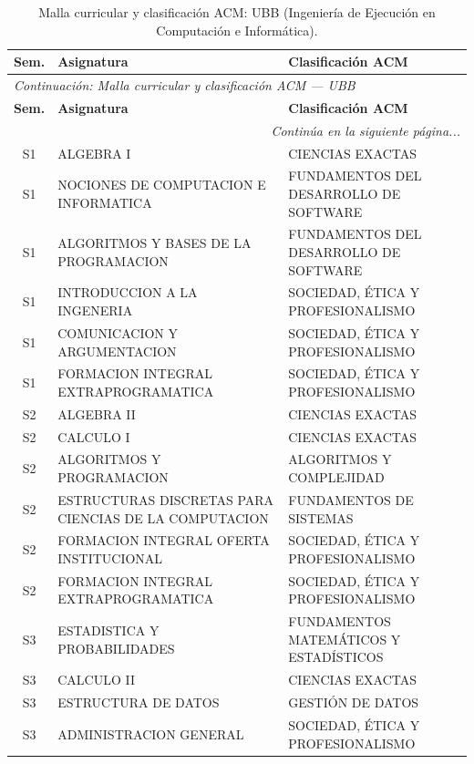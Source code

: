 \documentclass[11pt,a4paper]{article}
\begin{document}
\begin{small}
\begin{longtable}{c >{\raggedright\arraybackslash}p{8.5cm} >{\raggedright\arraybackslash}p{5.5cm}}
\caption{Malla curricular y clasificación ACM: UBB (Ingeniería de Ejecución en Computación e Informática).} \label{tab:UBB14} \\
\toprule
\textbf{Sem.} & \textbf{Asignatura} & \textbf{Clasificación ACM} \\
\midrule
\endfirsthead
\multicolumn{3}{l}{\small\textit{Continuación: Malla curricular y clasificación ACM --- UBB}} \\[3pt]
\toprule
\textbf{Sem.} & \textbf{Asignatura} & \textbf{Clasificación ACM} \\
\midrule
\endhead
\midrule
\multicolumn{3}{r}{\small\textit{Continúa en la siguiente página...}} \\
\endfoot
\bottomrule
\endlastfoot
S1 & ALGEBRA I & CIENCIAS EXACTAS \\
S1 & NOCIONES DE COMPUTACION E INFORMATICA & FUNDAMENTOS DEL DESARROLLO DE SOFTWARE \\
S1 & ALGORITMOS Y BASES DE LA PROGRAMACION & FUNDAMENTOS DEL DESARROLLO DE SOFTWARE \\
S1 & INTRODUCCION A LA INGENERIA & SOCIEDAD, ÉTICA Y PROFESIONALISMO \\
S1 & COMUNICACION Y ARGUMENTACION & SOCIEDAD, ÉTICA Y PROFESIONALISMO \\
S1 & FORMACION INTEGRAL EXTRAPROGRAMATICA & SOCIEDAD, ÉTICA Y PROFESIONALISMO \\
S2 & ALGEBRA II & CIENCIAS EXACTAS \\
S2 & CALCULO I & CIENCIAS EXACTAS \\
S2 & ALGORITMOS Y PROGRAMACION & ALGORITMOS Y COMPLEJIDAD \\
S2 & ESTRUCTURAS DISCRETAS PARA CIENCIAS DE LA COMPUTACION & FUNDAMENTOS DE SISTEMAS \\
S2 & FORMACION INTEGRAL OFERTA INSTITUCIONAL & SOCIEDAD, ÉTICA Y PROFESIONALISMO \\
S2 & FORMACION INTEGRAL EXTRAPROGRAMATICA & SOCIEDAD, ÉTICA Y PROFESIONALISMO \\
S3 & ESTADISTICA Y PROBABILIDADES & FUNDAMENTOS MATEMÁTICOS Y ESTADÍSTICOS \\
S3 & CALCULO II & CIENCIAS EXACTAS \\
S3 & ESTRUCTURA DE DATOS & GESTIÓN DE DATOS \\
S3 & ADMINISTRACION GENERAL & SOCIEDAD, ÉTICA Y PROFESIONALISMO \\

\end{longtable}
\end{small}
\end{document}
